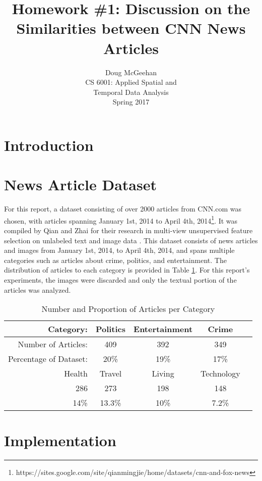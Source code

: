 \documentclass[11pt]{article}
\title{Homework \#1: Discussion on the Similarities between CNN News Articles}
\author{Doug McGeehan\\
		CS 6001: Applied Spatial and \\ Temporal Data Analysis\\
		Spring 2017}
\begin{document}
\maketitle

\section{Introduction}


\section{News Article Dataset}

For this report, a dataset consisting of over 2000 articles from CNN.com was chosen, with articles spanning January 1st, 2014 to April 4th, 2014\footnote{
https://sites.google.com/site/qianmingjie/home/datasets/cnn-and-fox-news
}.
It was compiled by Qian and Zhai for their research in multi-view unsupervised feature selection on unlabeled text and image data \cite{qian2014unsupervised}.
This dataset consists of news articles and images from January 1st, 2014, to April 4th, 2014, and spans multiple categories such as articles about crime, politics, and entertainment.
The distribution of articles to each category is provided in Table \ref{table:categories}.
For this report's experiments, the images were discarded and only the textual portion of the articles was analyzed.

\begin{table}[h]
	\centering
	\begin{tabular}{ r c c c c  }
		\hline
	Category: &              Politics & Entertainment & Crime & \\ \hline
	Number of Articles: &    409 &      392 &           349 & \\ \hline
	Percentage of Dataset: & 20\% &    19\% &           17\% & \\
	  \hline
	  \hline
	   Health & Travel & Living & Technology \\ \hline
	   286    & 273    & 198    & 148 \\ \hline
	   14\%   & 13.3\% & 10\%   & 7.2\% \\
	\hline
	\end{tabular}
	
	\caption{Number and Proportion of Articles per Category}
	\label{table:categories}
\end{table}

\section{Implementation}
\end{document}
